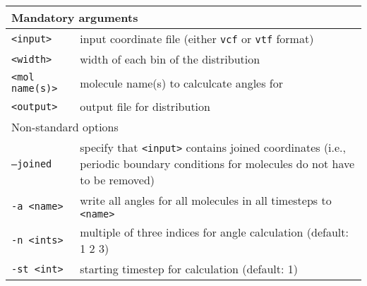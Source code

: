 \noindent
\begin{longtable}{p{}p{}}
  \toprule
  \multicolumn{2}{l}{Mandatory arguments} \\
  \midrule
  \texttt{<input>} & input coordinate file (either \texttt{vcf} or
    \texttt{vtf} format) \\
  \texttt{<width>} & width of each bin of the distribution \\
  \texttt{<mol name(s)>} & molecule name(s) to calculcate angles for \\
  \texttt{<output>} & output file for distribution \\
  \toprule
  \multicolumn{2}{l}{Non-standard options} \\
  \midrule
  \texttt{--joined} & specify that \texttt{<input>} contains joined
    coordinates (i.e., periodic boundary conditions for molecules do not
    have to be removed) \\
  \texttt{-a <name>} & write all angles for all molecules in all timesteps
    to \texttt{<name>} \\
  \texttt{-n  <ints>} & multiple of three indices for angle calculation (default: 1 2 3) \\
  \texttt{-st <int>} & starting timestep for calculation (default: 1) \\
  \bottomrule
\end{longtable}

